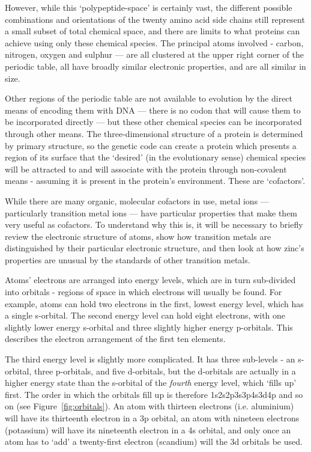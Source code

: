 However, while this `polypeptide-space' is certainly vast, the different possible combinations and orientations of the twenty amino acid side chains still represent a small subset of total chemical space, and there are limits to what proteins can achieve using only these chemical species. The principal atoms involved - carbon, nitrogen, oxygen and sulphur --- are all clustered at the upper right corner of the periodic table, all have broadly similar electronic properties, and are all similar in size.

Other regions of the periodic table are not available to evolution by the direct means of encoding them with DNA --- there is no codon that will cause them to be incorporated directly --- but these other chemical species can be incorporated through other means. The three-dimensional structure of a protein is determined by primary structure, so the genetic code can create a protein which presents a region of its surface that the `desired' (in the evolutionary sense) chemical species will be attracted to and will associate with the protein through non-covalent means - assuming it is present in the protein's environment. These are `cofactors'.

While there are many organic, molecular cofactors in use, metal ions --- particularly transition metal ions --- have particular properties that make them very useful as cofactors. To understand why this is, it will be necessary to briefly review the electronic structure of atoms, show how transition metals are distinguished by their particular electronic structure, and then look at how zinc's properties are unusual by the standards of other transition metals.

Atoms' electrons are arranged into energy levels, which are in turn sub-divided into orbitals - regions of space in which electrons will usually be found. For example, atoms can hold two electrons in the first, lowest energy level, which has a single s-orbital. The second energy level can hold eight electrons, with one slightly lower energy s-orbital and three slightly higher energy p-orbitals. This describes the electron arrangement of the first ten elements.

The third energy level is slightly more complicated. It has three sub-levels - an s-orbital, three p-orbitals, and five d-orbitals, but the d-orbitals are actually in a higher energy state than the s-orbital of the \emph{fourth} energy level, which `fills up' first. The order in which the orbitals fill up is therefore 1s2s2p3s3p4s3d4p and so on (see Figure~\ref{fig:orbitals}). An atom with thirteen electrons (i.e. aluminium) will have its thirteenth electron in a 3p orbital, an atom with nineteen electrons (potassium) will have its nineteenth electron in a 4s orbital, and only once an atom has to `add' a twenty-first electron (scandium) will the 3d orbitals be used.

